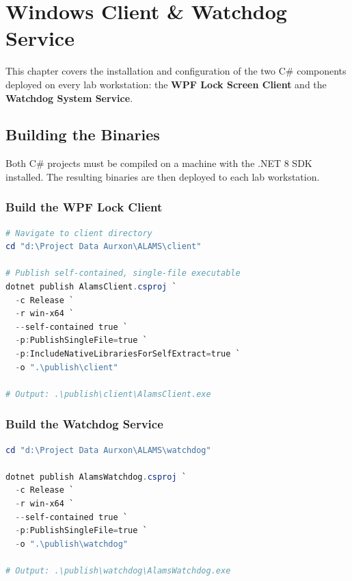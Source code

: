 \chapter{Windows Client \& Watchdog Service}
\label{ch:client}

This chapter covers the installation and configuration of the two C\# components deployed on every lab workstation: the \textbf{WPF Lock Screen Client} and the \textbf{Watchdog System Service}.

\section{Building the Binaries}

Both C\# projects must be compiled on a machine with the .NET 8 SDK installed. The resulting binaries are then deployed to each lab workstation.

\subsection{Build the WPF Lock Client}

\begin{tcolorbox}[codebox, title={Publish AlamsClient.exe}]
\begin{lstlisting}[language=PowerShell]
# Navigate to client directory
cd "d:\Project Data Aurxon\ALAMS\client"

# Publish self-contained, single-file executable
dotnet publish AlamsClient.csproj `
  -c Release `
  -r win-x64 `
  --self-contained true `
  -p:PublishSingleFile=true `
  -p:IncludeNativeLibrariesForSelfExtract=true `
  -o ".\publish\client"

# Output: .\publish\client\AlamsClient.exe
\end{lstlisting}
\end{tcolorbox}

\subsection{Build the Watchdog Service}

\begin{tcolorbox}[codebox, title={Publish AlamsWatchdog.exe}]
\begin{lstlisting}[language=PowerShell]
cd "d:\Project Data Aurxon\ALAMS\watchdog"

dotnet publish AlamsWatchdog.csproj `
  -c Release `
  -r win-x64 `
  --self-contained true `
  -p:PublishSingleFile=true `
  -o ".\publish\watchdog"

# Output: .\publish\watchdog\AlamsWatchdog.exe
\end{lstlisting}
\end{tcolorbox}

